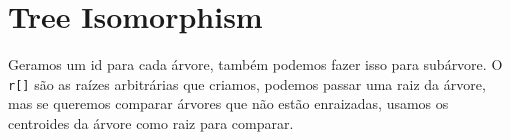     
    
    \section{Tree Isomorphism}
    Geramos um id para cada árvore, também podemos fazer isso para subárvore. O \texttt{r[]} são as raízes arbitrárias que criamos, podemos passar uma raiz da árvore, mas se queremos comparar árvores que não estão enraizadas, usamos os centroides da árvore como raiz para comparar.

